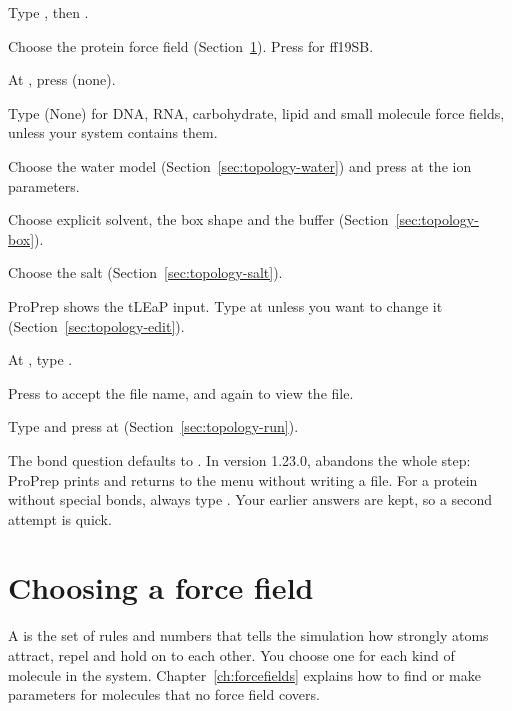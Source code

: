 \begin{steps}
  \item Type , then .
  \item Choose the protein force field (Section~\ref{sec:topology-ff}). Press
         for ff19SB.
  \item At , press  (none).
  \item Type  (None) for DNA, RNA, carbohydrate, lipid and small
        molecule force fields, unless your system contains them.
  \item Choose the water model (Section~\ref{sec:topology-water}) and press
         at the ion parameters.
  \item Choose explicit solvent, the box shape and the buffer
        (Section~\ref{sec:topology-box}).
  \item Choose the salt (Section~\ref{sec:topology-salt}).
  \item ProPrep shows the tLEaP input. Type  at  unless you want to change it
        (Section~\ref{sec:topology-edit}).
  \item At , type .
  \item Press  to accept the file name, and  again to
        view the file.
  \item Type  and press  at 
        (Section~\ref{sec:topology-run}).
\end{steps}

\begin{watchout}
The bond question defaults to . In version 1.23.0,  abandons
the whole step: ProPrep prints  and returns to the menu without writing a file. For a protein without
special bonds, always type . Your earlier answers are kept, so a second
attempt is quick.
\end{watchout}

\section{Choosing a force field}\label{sec:topology-ff}

A  is the set of rules and numbers that tells the
simulation how strongly atoms attract, repel and hold on to each other. You
choose one for each kind of molecule in the system. Chapter~\ref{ch:forcefields}
explains how to find or make parameters for molecules that no force field
covers.

